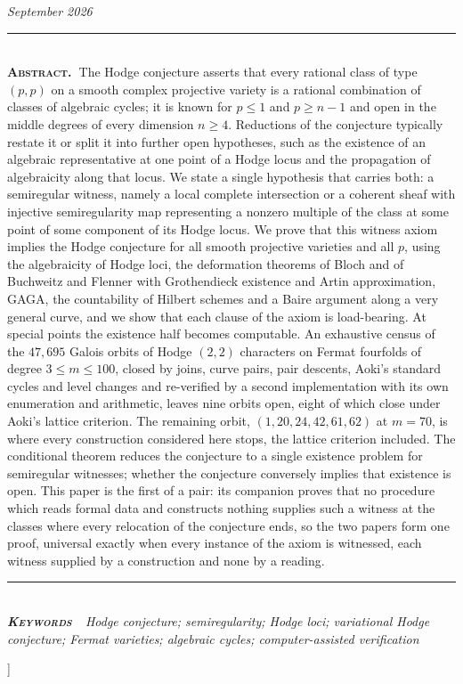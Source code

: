 \documentclass[10pt,twocolumn]{article}
\begin{document}
{\begin{center}
{\itshape\color{faint}\small September 2026}\\[14pt]
\end{center}
\begin{minipage}{\textwidth}
{\color{accent}\rule{\textwidth}{0.6pt}}\\[4pt]
{\small\hspace{1em}\textbf{\scshape\color{deep}Abstract.\ }The Hodge
conjecture asserts that every rational class of type \((p,p)\) on a
smooth complex projective variety is a rational combination of classes
of algebraic cycles; it is known for \(p\le 1\) and \(p\ge n-1\) and
open in the middle degrees of every dimension \(n\ge 4\). Reductions of
the conjecture typically restate it or split it into further open
hypotheses, such as the existence of an algebraic representative at one
point of a Hodge locus and the propagation of algebraicity along that
locus. We state a single hypothesis that carries both: a semiregular
witness, namely a local complete intersection or a coherent sheaf with
injective semiregularity map representing a nonzero multiple of the
class at some point of some component of its Hodge locus. We prove that
this witness axiom implies the Hodge conjecture for all smooth
projective varieties and all \(p\), using the algebraicity of Hodge
loci, the deformation theorems of Bloch and of Buchweitz and Flenner
with Grothendieck existence and Artin approximation, GAGA, the
countability of Hilbert schemes and a Baire argument along a very
general curve, and we show that each clause of the axiom is
load-bearing. At special points the existence half becomes computable.
An exhaustive census of the \(47{,}695\) Galois orbits of Hodge
\((2,2)\) characters on Fermat fourfolds of degree \(3\le m\le 100\),
closed by joins, curve pairs, pair descents, Aoki's standard cycles and
level changes and re-verified by a second implementation with its own
enumeration and arithmetic, leaves nine orbits open, eight of which
close under Aoki's lattice criterion. The remaining orbit,
\((1,20,24,42,61,62)\) at \(m=70\), is where every construction
considered here stops, the lattice criterion included. The conditional
theorem reduces the conjecture to a single existence problem for
semiregular witnesses; whether the conjecture conversely implies that
existence is open. This paper is the first of a pair: its companion
proves that no procedure which reads formal data and constructs nothing
supplies such a witness at the classes where every relocation of the
conjecture ends, so the two papers form one proof, universal exactly
when every instance of the axiom is witnessed, each witness supplied by
a construction and none by a reading.}\\[4pt]
{\color{accent}\rule{\textwidth}{0.6pt}}\\[3pt]
{\itshape\footnotesize\color{faint}\textbf{\upshape\scshape\color{deep}Keywords\ }\ Hodge
conjecture; semiregularity; Hodge loci; variational Hodge conjecture;
Fermat varieties; algebraic cycles; computer-assisted
verification}\\[12pt]
\end{minipage}
}]
\end{document}
